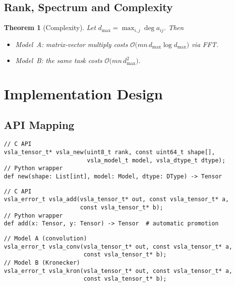 \documentclass[11pt]{article}
\newtheorem{theorem}{Theorem}[section]
\begin{document}
\subsection{Rank, Spectrum and Complexity}
\begin{theorem}[Complexity]\label{thm:complexity}
Let $d_{\max}=\max_{i,j}\deg a_{ij}$.  Then
\begin{itemize}[leftmargin=1.5em]
  \item Model A: matrix‑vector multiply costs $\mathcal O\bigl(mn\,d_{\max}\log d_{\max}\bigr)$ via FFT.
  \item Model B: the same task costs $\mathcal O\bigl(mn\,d_{\max}^{2}\bigr)$.
\end{itemize}
\end{theorem}

\section{Implementation Design}
\label{sec:implementation}

\subsection{API Mapping}
\label{sec:api}

\begin{tcolorbox}[colback=api,colframe=green!50!black,title=C Library API Mapping]
\begin{description}[leftmargin=2em]
\item[Tensor Creation:] 
\begin{verbatim}
// C API
vsla_tensor_t* vsla_new(uint8_t rank, const uint64_t shape[], 
                        vsla_model_t model, vsla_dtype_t dtype);
// Python wrapper  
def new(shape: List[int], model: Model, dtype: DType) -> Tensor
\end{verbatim}

\item[Variable-Shape Operations:]
\begin{verbatim}
// C API  
vsla_error_t vsla_add(vsla_tensor_t* out, const vsla_tensor_t* a, 
                      const vsla_tensor_t* b);
// Python wrapper
def add(x: Tensor, y: Tensor) -> Tensor  # automatic promotion
\end{verbatim}

\item[Semiring Products:]
\begin{verbatim}
// Model A (convolution)
vsla_error_t vsla_conv(vsla_tensor_t* out, const vsla_tensor_t* a, 
                       const vsla_tensor_t* b);
// Model B (Kronecker)  
vsla_error_t vsla_kron(vsla_tensor_t* out, const vsla_tensor_t* a,
                       const vsla_tensor_t* b);
\end{verbatim}
\end{description}
\end{tcolorbox}
\end{document}
